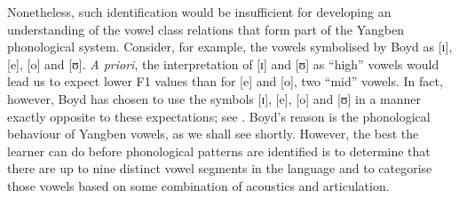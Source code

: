 Nonetheless, such identification  would be insufficient for developing an understanding of the vowel class relations that form part of the Yangben  phonological system. Consider, for example, the vowels symbolised by Boyd as [ɪ], [e], [o] and [ʊ]. {\it A priori}, the interpretation of [ɪ] and [ʊ] as ``high'' vowels would lead us to expect lower F1 values than for [e] and [o], two ``mid'' vowels. In fact, however, Boyd has chosen to use the symbols [ɪ], [e], [o] and [ʊ] in a manner exactly opposite to these expectations; see . Boyd's reason is the phonological behaviour of Yangben  vowels, as we shall see shortly. However, the best the learner can do before phonological patterns are identified  is to determine that there are up to nine distinct vowel segments in the language and to categorise those vowels based on some combination of acoustics and articulation.

